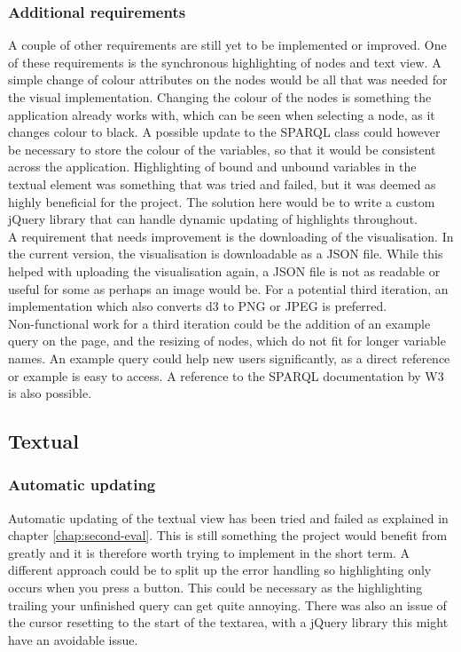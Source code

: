 \subsubsection{Additional requirements}
A couple of other requirements are still yet to be implemented or improved. One of these requirements is the synchronous highlighting of nodes and text view. A simple change of colour attributes on the nodes would be all that was needed for the visual implementation. Changing the colour of the nodes is something the application already works with, which can be seen when selecting a node, as it changes colour to black. A possible update to the SPARQL class could however be necessary to store the colour of the variables, so that it would be consistent across the application. Highlighting of bound and unbound variables in the textual element was something that was tried and failed, but it was deemed as highly beneficial for the project. The solution here would be to write a custom jQuery library that can handle dynamic updating of highlights throughout.\\
A requirement that needs improvement is the downloading of the visualisation. In the current version, the visualisation is downloadable as a JSON file. While this helped with uploading the visualisation again, a JSON file is not as readable or useful for some as perhaps an image would be. For a potential third iteration, an implementation which also converts d3 to PNG or JPEG is preferred\cite{D3toImage}.\\
Non-functional work for a third iteration could be the addition of an example query on the page, and the resizing of nodes, which do not fit for longer variable names. An example query could help new users significantly, as a direct reference or example is easy to access. A reference to the SPARQL documentation by W3 is also possible\cite{W3Documentation}.

\subsection{Textual}
\subsubsection{Automatic updating}
Automatic updating of the textual view has been tried and failed as explained in chapter \ref{chap:second-eval}. This is still something the project would benefit from greatly and it is therefore worth trying to implement in the short term. A different approach could be to split up the error handling so highlighting only occurs when you press a button. This could be necessary as the highlighting trailing your unfinished query can get quite annoying. There was also an issue of the cursor resetting to the start of the textarea, with a jQuery library this might have an avoidable issue.

